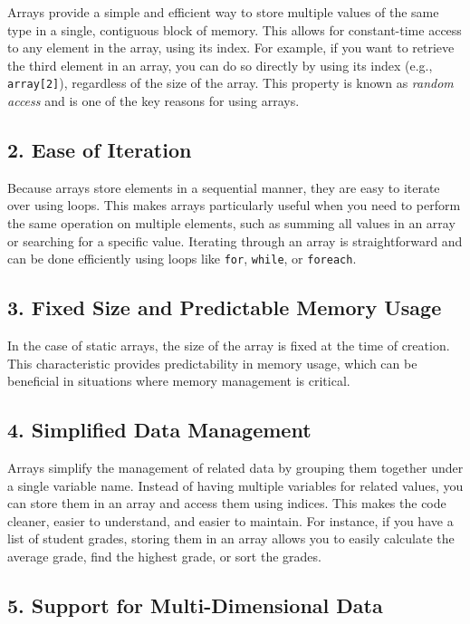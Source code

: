 \documentclass{book}
\begin{document}
	Arrays provide a simple and efficient way to store multiple values of the same type in a single, contiguous block of memory. This allows for constant-time access to any element in the array, using its index. For example, if you want to retrieve the third element in an array, you can do so directly by using its index (e.g., \texttt{array[2]}), regardless of the size of the array. This property is known as \textit{random access} and is one of the key reasons for using arrays.
	
	\subsection{2. Ease of Iteration}
	
	Because arrays store elements in a sequential manner, they are easy to iterate over using loops. This makes arrays particularly useful when you need to perform the same operation on multiple elements, such as summing all values in an array or searching for a specific value. Iterating through an array is straightforward and can be done efficiently using loops like \texttt{for}, \texttt{while}, or \texttt{foreach}.
	
	\subsection{3. Fixed Size and Predictable Memory Usage}
	
	In the case of static arrays, the size of the array is fixed at the time of creation. This characteristic provides predictability in memory usage, which can be beneficial in situations where memory management is critical.
	
	\subsection{4. Simplified Data Management}
	
	Arrays simplify the management of related data by grouping them together under a single variable name. Instead of having multiple variables for related values, you can store them in an array and access them using indices. This makes the code cleaner, easier to understand, and easier to maintain. For instance, if you have a list of student grades, storing them in an array allows you to easily calculate the average grade, find the highest grade, or sort the grades.
	
	\subsection{5. Support for Multi-Dimensional Data}
	
\end{document}
